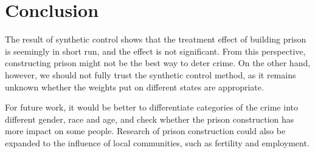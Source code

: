 \documentclass{article}
\begin{document}
\section{Conclusion}

The result of synthetic control shows that the treatment effect of building prison is seemingly in short run, and the effect is not significant. From this perspective, constructing prison might not be the best way to deter crime. On the other hand, however, we should not fully trust the synthetic control method, as it remains unknown whether the weights put on different states are appropriate. 

For future work, it would be better to differentiate categories of the crime into different gender, race and age, and check whether the prison construction has more impact on some people. Research of prison construction could also be expanded to the influence of local communities, such as fertility and employment.

\printbibliography[title={References}]
\end{document}
